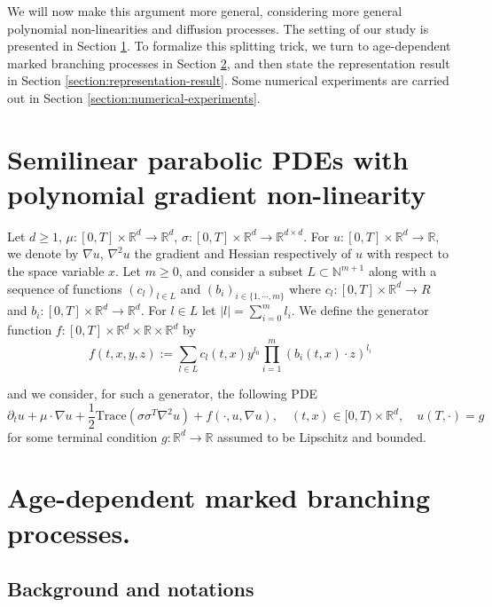 \documentclass[11pt]{article}
\newcommand{\R}{\mathbb{R}}
\newcommand{\N}{\mathbb{N}}
\renewcommand{\geq}{\geqslant}
\theoremstyle{definition}
\theoremstyle{remark}
\begin{document}
We will now make this argument more general, considering more general polynomial non-linearities and diffusion processes. The setting of our study is presented in Section \ref{section:pde-polynomial-non-linear}. 
To formalize this splitting trick, we turn to age-dependent marked branching processes in Section \ref{section:branching-processes}, and then state the representation result in Section \ref{section:representation-result}. Some numerical experiments are carried out in Section \ref{section:numerical-experiments}. 

\section{Semilinear parabolic PDEs with polynomial gradient non-linearity}
\label{section:pde-polynomial-non-linear}

Let $d \geq 1$, $\mu: [0,T]\times \R ^{d} \rightarrow \R ^{d}$, $\sigma: [0,T] \times \R ^{d} \rightarrow \R ^{d \times d}$. For $u: [0,T]\times \R ^{d} \rightarrow \R$, we denote by $\nabla u$, $\nabla ^{2} u$ the gradient and Hessian respectively of $u$ with respect to the space variable $x$. Let $m \geq 0$, and consider a subset $L \subset \N ^{m + 1}$ along with a sequence of functions $(c _{l})_{l \in L}$ and $(b_i)_{i \in \{1, \cdots, m\}}$ where $c_l : [0,T]\times \R ^{d} \rightarrow R$ and $b_i :[0,T] \times \R ^{d} \rightarrow \R ^{d}$. For $l \in L$ let $|l| = \sum_{i = 0} ^{m} l_i$. We define the generator function $f: [0,T]\times \R ^{d}\times \R \times \R ^{d}$ by
\begin{equation}
	\label{eq:generator}
    f(t,x,y,z) := \sum _{l \in L} c_l(t,x)y ^{l_0} \prod _{i = 1}^{m} (b_i(t,x) \cdot z)^{l_i}
\end{equation}

and we consider, for such a generator, the following PDE
 \begin{equation}
	 \label{eq:pde}
 \partial_t u + \mu \cdot \nabla u + \frac{1}{2}\mathrm{Trace}(\sigma \sigma ^{T}\nabla ^{2}u) + f(\cdot,u,\nabla u), \quad (t,x) \in [0,T)\times \R ^{d}, \quad u(T,\cdot) = g
 \end{equation}
 for some terminal condition $g : \R ^{d} \rightarrow \R$ assumed to be Lipschitz and bounded.

\section{Age-dependent marked branching processes.}
\label{section:branching-processes}
\subsection{Background and notations}
\end{document}
